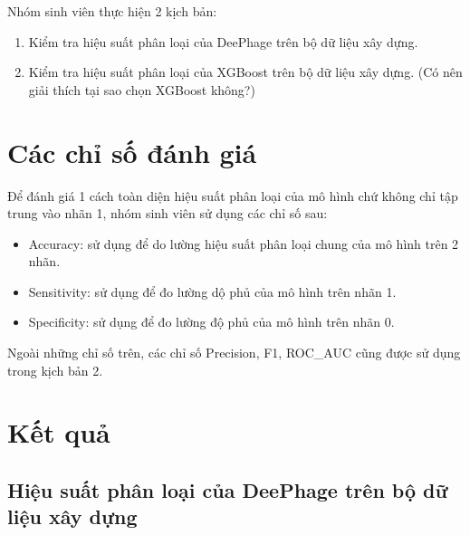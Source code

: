 Nhóm sinh viên thực hiện 2 kịch bản:
\begin{enumerate}
    \item Kiểm tra hiệu suất phân loại của DeePhage trên bộ dữ liệu xây dựng.
    \item Kiểm tra hiệu suất phân loại của XGBoost trên bộ dữ liệu xây dựng. (Có nên giải thích tại sao chọn XGBoost không?)
\end{enumerate}



\section{Các chỉ số đánh giá}
Để đánh giá 1 cách toàn diện hiệu suất phân loại của mô hình chứ không chỉ tập trung vào nhãn 1, nhóm sinh viên sử dụng các chỉ số sau:
\begin{itemize}
    \item Accuracy: sử dụng để do lường hiệu suất phân loại chung của mô hình trên 2 nhãn.
    \item Sensitivity: sử dụng để đo lường dộ phủ của mô hình trên nhãn 1.
    \item Specificity: sử dụng để đo lường độ phủ của mô hình trên nhãn 0.
\end{itemize}
Ngoài những chỉ số trên, các chỉ số Precision, F1, ROC\_AUC cũng được sử dụng trong kịch bản 2.

\section{Kết quả}
\subsection{Hiệu suất phân loại của DeePhage trên bộ dữ liệu xây dựng}

